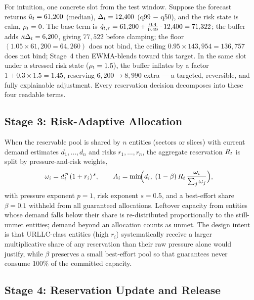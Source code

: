 For intuition, one concrete slot from the test window. Suppose the
forecast returns $\hat{u}_t = 61{,}200$ (median), $\Delta_t = 12{,}400$
(q99 $-$ q50), and the risk state is calm, $\rho_t = 0$. The base
term is $\hat{q}_{t,\tau} = 61{,}200 + \frac{0.4}{0.49} \cdot 12{,}400 =
71{,}322$; the buffer adds $\kappa \Delta_t = 6{,}200$, giving
$77{,}522$ before clamping; the floor $(1.05 \times 61{,}200 =
64{,}260)$ does not bind, the ceiling $0.95 \times 143{,}954 =
136{,}757$ does not bind; Stage~4 then EWMA-blends toward this
target. In the same slot under a stressed risk state
($\rho_t = 1.5$), the buffer inflates by a factor $1 + 0.3 \times
1.5 = 1.45$, reserving $6{,}200 \rightarrow 8{,}990$ extra ---
a targeted, reversible, and fully explainable adjustment. Every
reservation decision decomposes into these four readable terms.

\subsection{Stage 3: Risk-Adaptive Allocation}
\label{sec:stage3}

When the reservable pool is shared by $n$ entities (sectors or
slices) with current demand estimates $d_1, \dots, d_n$ and risks
$r_1, \dots, r_n$, the aggregate reservation $R_t$ is split by
pressure-and-risk weights,
\begin{equation}
\omega_i = d_i^{\,p} \,(1 + r_i)^{\,s},
\qquad
A_i = \min\!\Bigl(d_i,\; (1-\beta)\,R_t\,
\frac{\omega_i}{\sum_j \omega_j}\Bigr),
\label{eq:alloc}
\end{equation}
with pressure exponent $p = 1$, risk exponent $s = 0.5$, and a
best-effort share $\beta = 0.1$ withheld from all guaranteed
allocations. Leftover capacity from entities whose demand falls below
their share is re-distributed proportionally to the still-unmet
entities; demand beyond an allocation counts as unmet. The design
intent is that URLLC-class entities (high $r_i$) systematically
receive a larger multiplicative share of any reservation than their
raw pressure alone would justify, while $\beta$ preserves a small
best-effort pool so that guarantees never consume 100\% of the
committed capacity.

\subsection{Stage 4: Reservation Update and Release}
\label{sec:stage4}


